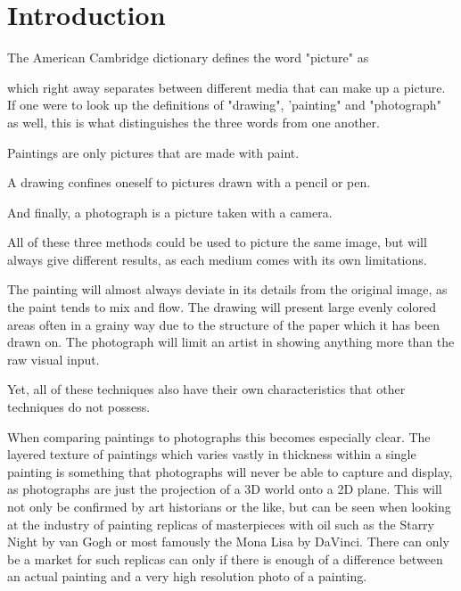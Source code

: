 \chapter{Introduction}



The American Cambridge dictionary defines the word "picture" as
    
 
which right away separates between different media that can make up a picture.
If one were to look up the definitions of "drawing", 'painting" and "photograph" as well, this is what distinguishes the three words from one another.

Paintings are only pictures that are made with paint.

A drawing confines oneself to pictures drawn with a pencil or pen.

And finally, a photograph is a picture taken with a camera.

All of these three methods could be used to picture the same image, but will always give different results, as each medium comes with its own limitations.

The painting will almost always deviate in its details from the original image, as the paint tends to mix and flow.
The drawing will present large evenly colored areas often in a grainy way due to the structure of the paper which it has been drawn on.
The photograph will limit an artist in showing anything more than the raw visual input.

Yet, all of these techniques also have their own characteristics that other techniques do not possess.

When comparing paintings to photographs this becomes especially clear.
The layered texture of paintings which varies vastly in thickness within a single painting is something that photographs will never be able to capture and display, as photographs are just the projection of a 3D world onto a 2D plane.
This will not only be confirmed by art historians or the like, but can be seen when looking at the industry of painting replicas of masterpieces with oil such as the Starry Night by van Gogh or most famously the Mona Lisa by DaVinci.
There can only be a market for such replicas can only if there is enough of a difference between an actual painting and a very high resolution photo of a painting.

